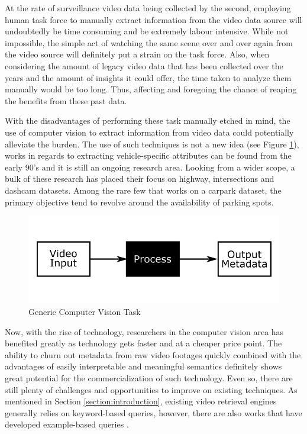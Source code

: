 
At the rate of surveillance video data being collected by the second, employing human task force to manually extract information from the video data source will undoubtedly be time consuming and be extremely labour intensive. 
While not impossible, the simple act of watching the same scene over and over again from the video source will definitely put a strain on the task force. Also, when considering the amount of legacy video data that has been collected over the years and the amount of insights it could offer, the time taken to analyze them manually would be too long. Thus, affecting and foregoing the chance of reaping the benefits from these past data.
 
With the disadvantages of performing these task manually etched in mind, the use of computer vision to extract information from video data could potentially alleviate the burden. The use of such techniques is not a new idea (see Figure \ref{fig:genericCV}), works in regards to extracting vehicle-specific attributes can be found from the early 90's and it is still an ongoing research area. Looking from a wider scope, a bulk of these research has placed their focus on highway, intersections and dashcam datasets. Among the rare few that works on a carpark dataset, the primary objective tend to revolve around the availability of parking spots.

\begin{figure}[!hbt]\centering
\includegraphics[width=.8\textwidth]{image/general/simpleframe.png}
\caption{Generic Computer Vision Task}
\label{fig:genericCV}
\end{figure}

Now, with the rise of technology, researchers in the computer vision area has benefited greatly as technology gets faster and at a cheaper price point. The ability to churn out metadata from raw video footages quickly combined with the advantages of easily interpretable and meaningful semantics definitely shows great potential for the commercialization of such technology. Even so, there are still plenty of challenges and opportunities to improve on existing techniques. As mentioned in Section \ref{section:introduction}, existing video retrieval engines generally relies on keyword-based queries, however, there are also works that have developed example-based queries . 

